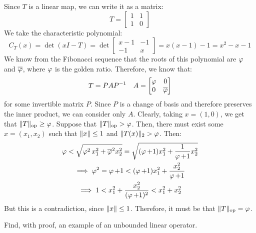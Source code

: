 \documentclass{article}
\begin{document}
\begin{soln}
    Since $ T $ is a linear map, we can write it as a matrix:
    \begin{equation*}
        T =
        \begin{bmatrix}
            1 & 1 \\ 1 & 0
        \end{bmatrix}
    \end{equation*}
    We take the characteristic polynomial:
    \begin{equation*}
        C_{T}(x) = \det(xI - T) =
        \det\begin{bmatrix}
            x-1 & -1 \\ -1 & x
        \end{bmatrix}
        = x(x - 1) - 1 = x^{2} - x - 1
    \end{equation*}
    We know from the Fibonacci sequence that the roots of this polynomial are
    $ \operatorname{\varphi} $ and $ \overline{\operatorname{\varphi}} $, where $ \operatorname{\varphi} $ is the golden ratio.
    Therefore, we know that:
    \begin{equation*}
        T = PAP^{-1} \quad A = \begin{bmatrix}
            \operatorname{\varphi} & 0 \\ 0 & \overline{\operatorname{\varphi}}
        \end{bmatrix}
    \end{equation*}
    for some invertible matrix $ P $.
    Since $ P $ is a change of basis and therefore preserves the inner product, we can
    consider only $ A $. \vsp
    Clearly, taking $ x = (1, 0) $, we get that $ \|T\|_{\textrm{op}} \geq \operatorname{\varphi} $.
    Suppose that $ \|T\|_{\textrm{op}} > \operatorname{\varphi} $. Then, there must exist some $ x = (x_{1}, x_{2}) $
    such that $ \|x\| \leq 1 $ and $ \|T(x)\|_{2} > \operatorname{\varphi} $. Then:
    \begin{gather*}
        \operatorname{\varphi} < \sqrt{\operatorname{\varphi}^{2}x_{1}^{2} + \overline{\operatorname{\varphi}}^{2}x_{2}^{2}}
        = \sqrt{(\operatorname{\varphi} + 1)x_{1}^{2} + \frac{1}{\operatorname{\varphi} + 1}x_{2}^{2}} \\
        \implies \operatorname{\varphi}^{2} = \operatorname{\varphi} + 1 < (\operatorname{\varphi} + 1)x_{1}^{2} + \frac{x_{2}^{2}}{\operatorname{\varphi} + 1} \\
        \implies 1 < x_{1}^{2} + \frac{x_{2}^{2}}{(\operatorname{\varphi} + 1)^{2}} < x_{1}^{2} + x_{2}^{2}
    \end{gather*}
    But this is a contradiction, since $ \|x\| \leq 1 $.
    Therefore, it must be that $ \|T\|_{\textrm{op}} = \operatorname{\varphi} $.
\end{soln}

\begin{qu}
    Find, with proof, an example of an unbounded linear operator.
\end{qu}
\end{document}

